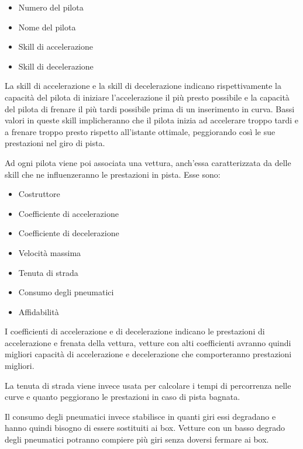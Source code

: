\documentclass[a4paper,11pt, twoside, openright]{book}
\begin{document}
      \begin{itemize}
	\item Numero del pilota
	\item Nome del pilota
	\item Skill di accelerazione
	\item Skill di decelerazione
      \end{itemize}
      
      La skill di accelerazione e la skill di decelerazione indicano rispettivamente la capacità del pilota di 
      iniziare l'accelerazione 
      il più presto possibile e la capacità del pilota di frenare 
      il più tardi possibile prima di un inserimento in curva. Bassi valori in queste skill implicheranno che il pilota 
      inizia ad accelerare troppo tardi e a frenare troppo presto 
      rispetto all'istante ottimale, peggiorando così le sue prestazioni nel giro di pista.
      
      Ad ogni pilota viene poi associata una vettura, anch'essa caratterizzata da delle skill che ne influenzeranno
      le prestazioni in pista. Esse sono:
      
      \begin{itemize}
	\item Costruttore
	\item Coefficiente di accelerazione
	\item Coefficiente di decelerazione
	\item Velocità massima
	\item Tenuta di strada
	\item Consumo degli pneumatici
	\item Affidabilità
      \end{itemize}
      
      I coefficienti di accelerazione e di decelerazione indicano le prestazioni di accelerazione e frenata della vettura, 
      vetture con alti coefficienti avranno quindi migliori capacità di accelerazione e decelerazione
      che comporteranno prestazioni migliori.
      
      La tenuta di strada viene invece usata per calcolare i tempi di percorrenza nelle curve e quanto peggiorano 
      le prestazioni in caso di pista bagnata.
      
      Il consumo degli pneumatici invece stabilisce in quanti giri essi degradano e hanno quindi bisogno di essere sostituiti
      ai box. Vetture con un basso degrado degli pneumatici potranno compiere più giri senza doversi fermare ai box.
      
\end{document}
